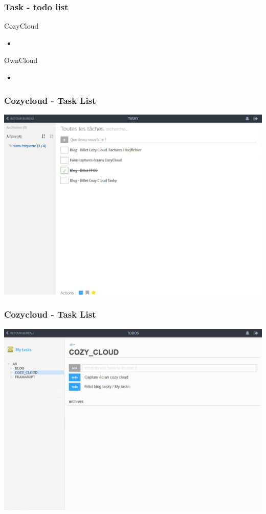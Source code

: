 \documentclass{beamer}
\begin{document}
\begin{frame}
\frametitle{Task - todo list}

\begin{block}{CozyCloud}
\begin{itemize}
\item 
\end{itemize}
\end{block}

\begin{block}{OwnCloud}
\begin{itemize}
\item 
\end{itemize}
\end{block}
\end{frame}

\begin{frame}
\frametitle{Cozycloud - Task List}
\includegraphics[scale=0.3] {./CozyCloud/CozyCloud_Tasky.jpg}
\end{frame}
\begin{frame}
\frametitle{Cozycloud - Task List}
\includegraphics[scale=0.3] {./CozyCloud/CozyCloud_Todos.jpg}
\end{frame}
\end{document}
